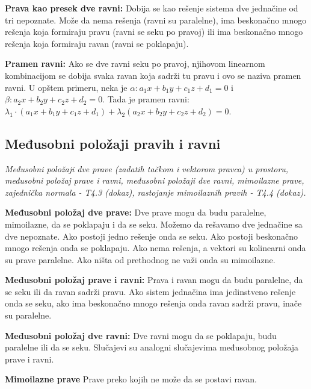 \documentclass[12pt]{article}
\begin{document}
\textbf{Prava kao presek dve ravni:} Dobija se kao rešenje sistema dve
jednačine od tri nepoznate. Može da nema rešenja (ravni su paralelne), ima
beskonačno mnogo rešenja koja formiraju pravu (ravni se seku po pravoj) ili ima
beskonačno mnogo rešenja koja formiraju ravan (ravni se poklapaju).
\par

\textbf{Pramen ravni:} Ako se dve ravni seku po pravoj, njihovom linearnom
kombinacijom se dobija svaka ravan koja sadrži tu pravu i ovo se naziva pramen
ravni. U opštem primeru, neka je $\alpha: a_1x+b_1y+c_1z+d_1=0$ i
$\beta: a_2x+b_2y+c_2z+d_2=0$. Tada je pramen ravni:
$\lambda_1\cdot(a_1x+b_1y+c_1z+d_1)+\lambda_2(a_2x+b_2y+c_2z+d_2)=0$.

\subsection{Međusobni položaji pravih i ravni}
\label{subsec:pitanje_16}
\textit{Međusobni položaji dve prave (zadatih tačkom i vektorom pravca) u
    prostoru, međusobni položaj prave i ravni, međusobni položaji dve ravni,
    mimoilazne prave, zajednička normala - T4.3 (dokaz), rastojanje mimoilaznih
    pravih - T4.4 (dokaz).}
\par
\vspace*{1cm}

\textbf{Međusobni položaj dve prave:} Dve prave mogu da budu paralelne,
mimoilazne, da se poklapaju i da se seku. Možemo da rešavamo dve jednačine sa
dve nepoznate. Ako postoji jedno rešenje onda se seku. Ako postoji beskonačno
mnogo rešenja onda se poklapaju. Ako nema rešenja, a vektori su kolinearni onda
su prave paralelne. Ako ništa od prethodnog ne važi onda su mimoilazne.
\par

\textbf{Međusobni položaj prave i ravni:} Prava i ravan mogu da budu paralelne,
da se seku ili da ravan sadrži pravu. Ako sistem jednačina ima jedinstveno
rešenje onda se seku, ako ima beskonačno mnogo rešenja onda ravan sadrži pravu,
inače su paralelne.
\par

\textbf{Međusobni položaj dve ravni:} Dve ravni mogu da se poklapaju, budu
paralelne ili da se seku. Slučajevi su analogni slučajevima međusobnog položaja
prave i ravni.
\par

\textbf{Mimoilazne prave} Prave preko kojih ne može da se postavi ravan.
\par
\end{document}
